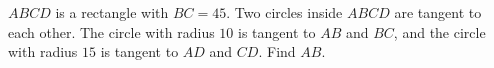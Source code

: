 $ABCD$ is a rectangle with $BC=45$. Two circles inside $ABCD$ are tangent to each other. The circle with radius $10$ is tangent to $AB$ and $BC$, and the circle with radius $15$ is tangent to $AD$ and $CD$. Find $AB$.
